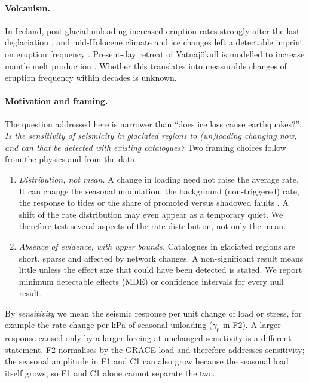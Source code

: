 \documentclass[11pt,a4paper]{article}
\begin{document}
\paragraph{Volcanism.}
In Iceland, post-glacial unloading increased eruption rates strongly after the last deglaciation \parencite{maclennan2002}, and mid-Holocene climate and ice changes left a detectable imprint on eruption frequency \parencite{swindles2018}. Present-day retreat of Vatnaj\"okull is modelled to increase mantle melt production \parencite{pagli2008,schmidt2013}. Whether this translates into measurable changes of eruption frequency within decades is unknown.

\paragraph{Motivation and framing.}
The question addressed here is narrower than ``does ice loss cause earthquakes?'': \emph{Is the sensitivity of seismicity in glaciated regions to (un)loading changing now, and can that be detected with existing catalogues?} Two framing choices follow from the physics and from the data.
\begin{enumerate}
  \item \emph{Distribution, not mean.} A change in loading need not raise the average rate. It can change the seasonal modulation, the background (non-triggered) rate, the response to tides or the share of promoted versus shadowed faults \parencite{harris1998}. A shift of the rate distribution may even appear as a temporary quiet. We therefore test several aspects of the rate distribution, not only the mean.
  \item \emph{Absence of evidence, with upper bounds.} Catalogues in glaciated regions are short, sparse and affected by network changes. A non-significant result means little unless the effect size that could have been detected is stated. We report minimum detectable effects (MDE) or confidence intervals for every null result.
\end{enumerate}
By \emph{sensitivity} we mean the seismic response per unit change of load or stress, for example the rate change per kPa of seasonal unloading ($\gamma_0$ in F2). A larger response caused only by a larger forcing at unchanged sensitivity is a different statement. F2 normalises by the GRACE load and therefore addresses sensitivity; the seasonal amplitude in F1 and C1 can also grow because the seasonal load itself grows, so F1 and C1 alone cannot separate the two.
\end{document}
